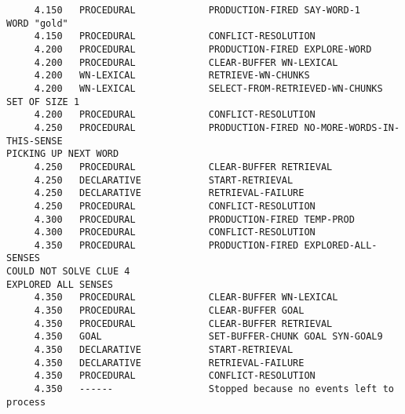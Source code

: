 \begin{verbatim}
     4.150   PROCEDURAL             PRODUCTION-FIRED SAY-WORD-1 
WORD "gold" 
     4.150   PROCEDURAL             CONFLICT-RESOLUTION 
     4.200   PROCEDURAL             PRODUCTION-FIRED EXPLORE-WORD 
     4.200   PROCEDURAL             CLEAR-BUFFER WN-LEXICAL 
     4.200   WN-LEXICAL             RETRIEVE-WN-CHUNKS 
     4.200   WN-LEXICAL             SELECT-FROM-RETRIEVED-WN-CHUNKS SET OF SIZE 1 
     4.200   PROCEDURAL             CONFLICT-RESOLUTION 
     4.250   PROCEDURAL             PRODUCTION-FIRED NO-MORE-WORDS-IN-THIS-SENSE 
PICKING UP NEXT WORD 
     4.250   PROCEDURAL             CLEAR-BUFFER RETRIEVAL 
     4.250   DECLARATIVE            START-RETRIEVAL 
     4.250   DECLARATIVE            RETRIEVAL-FAILURE 
     4.250   PROCEDURAL             CONFLICT-RESOLUTION 
     4.300   PROCEDURAL             PRODUCTION-FIRED TEMP-PROD 
     4.300   PROCEDURAL             CONFLICT-RESOLUTION 
     4.350   PROCEDURAL             PRODUCTION-FIRED EXPLORED-ALL-SENSES 
COULD NOT SOLVE CLUE 4 
EXPLORED ALL SENSES 
     4.350   PROCEDURAL             CLEAR-BUFFER WN-LEXICAL 
     4.350   PROCEDURAL             CLEAR-BUFFER GOAL 
     4.350   PROCEDURAL             CLEAR-BUFFER RETRIEVAL 
     4.350   GOAL                   SET-BUFFER-CHUNK GOAL SYN-GOAL9 
     4.350   DECLARATIVE            START-RETRIEVAL 
     4.350   DECLARATIVE            RETRIEVAL-FAILURE 
     4.350   PROCEDURAL             CONFLICT-RESOLUTION 
     4.350   ------                 Stopped because no events left to process 
\end{verbatim}

